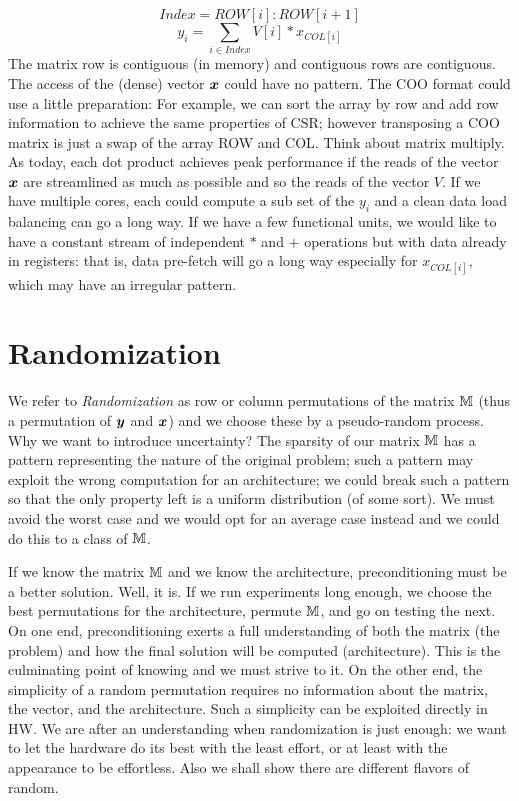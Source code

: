 \documentclass[manuscript,screen]{acmart}
\begin{document}
\[ Index = ROW[i]:ROW[i+1] \]
\[
y_i =  \sum_{i\in Index} V[i] * x_{COL[i]}  
\]
The matrix row is contiguous (in memory) and contiguous rows are
contiguous. The access of the (dense) vector ${\boldsymbol x}$ could have no
pattern. The COO format could use a little preparation: For example,
we can sort the array by row and add row information to achieve the
same properties of CSR; however transposing a COO matrix is just a
swap of the array ROW and COL. Think about matrix multiply. As today,
each dot product achieves peak performance if the reads of the vector
${\boldsymbol x}$ are streamlined as much as possible and so the reads of the
vector $V$. If we have multiple cores, each could compute a sub set of
the $y_i$ and a clean data load balancing can go a long way. If we
have a few functional units, we would like to have a constant stream
of independent $*$ and $+$ operations but with data already in
registers: that is, data pre-fetch will go a long way especially for
$x_{COL[i]}$, which may have an irregular pattern.


\section{Randomization}
\label{sec:randomization}
We refer to {\em Randomization} as row or column permutations of the
matrix $\mathbb{M}$ (thus a permutation of ${\boldsymbol y}$ and ${\boldsymbol x}$) and we choose
these by a pseudo-random process. Why we want to introduce
uncertainty? The sparsity of our matrix $\mathbb{M}$ has a pattern
representing the nature of the original problem; such a pattern may
exploit the wrong computation for an architecture; we could break such
a pattern so that the only property left is a uniform distribution (of
some sort). We must avoid the worst case and we would opt for an
average case instead and we could do this to a class of $\mathbb{M}$. 

If we know the matrix $\mathbb{M}$ and we know the architecture,
preconditioning must be a better solution.  Well, it is. If we run
experiments long enough, we choose the best permutations for the
architecture, permute $\mathbb{M}$, and go on testing the next.  On one end,
preconditioning exerts a full understanding of both the matrix (the
problem) and how the final solution will be computed
(architecture). This is the culminating point of knowing and we must
strive to it. On the other end, the simplicity of a random permutation
requires no information about the matrix, the vector, and the
architecture. Such a simplicity can be exploited directly in HW. We
are after an understanding when randomization is just enough: we want
to let the hardware do its best with the least effort, or at least
with the appearance to be effortless. Also we shall show there are
different flavors of random.
\end{document}
